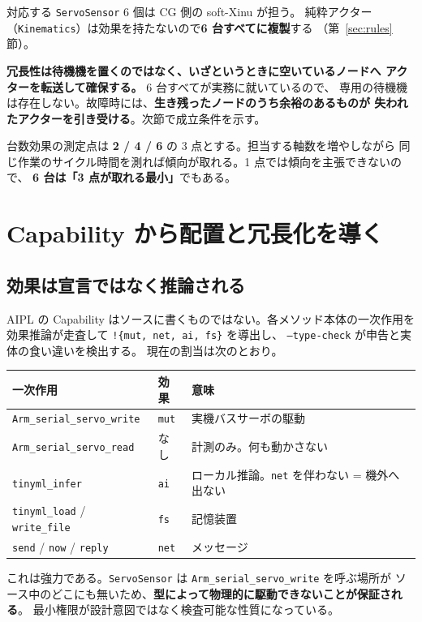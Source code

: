 \documentclass[11pt,a4paper]{article}
\newcommand{\code}[1]{\texttt{#1}}
\newcommand{\good}[1]{\textbf{\textcolor{green!45!black}{#1}}}
\begin{document}
対応する \code{ServoSensor} 6 個は CG 側の soft-Xinu が担う。
純粋アクター（\code{Kinematics}）は効果を持たないので\textbf{6 台すべてに複製}する
（第~\ref{sec:rules} 節）。

\textbf{冗長性は待機機を置くのではなく、いざというときに空いているノードへ
アクターを転送して確保する。} 6 台すべてが実務に就いているので、
専用の待機機は存在しない。故障時には、\textbf{生き残ったノードのうち余裕のあるものが
失われたアクターを引き受ける}。次節で成立条件を示す。

台数効果の測定点は \textbf{2 / 4 / 6} の 3 点とする。担当する軸数を増やしながら
同じ作業のサイクル時間を測れば傾向が取れる。1 点では傾向を主張できないので、
\textbf{6 台は「3 点が取れる最小」}でもある。

\section{Capability から配置と冗長化を導く}

\subsection{効果は宣言ではなく推論される}

AIPL の Capability はソースに書くものではない。各メソッド本体の一次作用を
効果推論が走査して \code{!\{mut, net, ai, fs\}} を導出し、
\code{--type-check} が申告と実体の食い違いを検出する。
現在の割当は次のとおり。

\begin{center}\small
\begin{tabularx}{\textwidth}{@{}l l X@{}}
\toprule
\textbf{一次作用} & \textbf{効果} & \textbf{意味}\\
\midrule
\code{Arm\_serial\_servo\_write} & \code{mut} & 実機バスサーボの駆動\\
\code{Arm\_serial\_servo\_read}  & なし & 計測のみ。何も動かさない\\
\code{tinyml\_infer}            & \code{ai} & ローカル推論。\code{net} を伴わない = 機外へ出ない\\
\code{tinyml\_load} / \code{write\_file} & \code{fs} & 記憶装置\\
\code{send} / \code{now} / \code{reply} & \code{net} & メッセージ\\
\bottomrule
\end{tabularx}
\end{center}

これは強力である。\code{ServoSensor} は \code{Arm\_serial\_servo\_write} を呼ぶ場所が
ソース中のどこにも無いため、\good{型によって物理的に駆動できないことが保証される}。
最小権限が設計意図ではなく検査可能な性質になっている。
\end{document}
